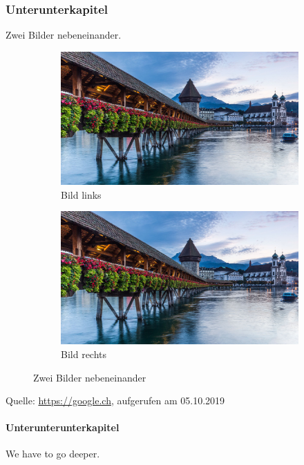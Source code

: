 \subsubsection{Unterunterkapitel}
Zwei Bilder nebeneinander.
\begin{figure}[H]
	\centering
	\captionsetup[subfigure]{justification=centering}
	\begin{subfigure}[b]{0.48\textwidth}
  	\centering
		\includegraphics[width=0.95\linewidth]{../fig/placeholder}
		\caption{Bild links}
		\label{fig:left}
	\end{subfigure}
	\begin{subfigure}[b]{0.48\textwidth}
		\centering
		\includegraphics[width=0.95\linewidth]{../fig/placeholder}
		\caption{Bild rechts}
		\label{fig:right}
	\end{subfigure}
	\caption{Zwei Bilder nebeneinander}\label{fig:two_pictures}
\end{figure}\vspace{\skipAfterFigure pt}
{\footnotesize Quelle: \url{https://google.ch}, aufgerufen am 05.10.2019} 
\paragraph{Unterunterunterkapitel}
We have to go deeper.
